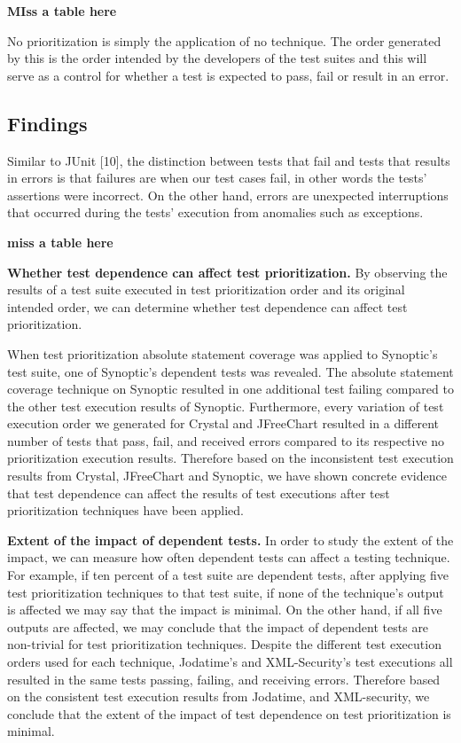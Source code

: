 \textbf{MIss a table here}

No prioritization is simply the application of no technique. The order generated by this is the order intended by the developers of the test suites and this will serve as a control for whether a test is expected to pass, fail or result in an error.

\subsection{Findings}

Similar to JUnit [10], the distinction between tests that fail and tests that results in errors is that failures are when our test cases fail, in other words the tests' assertions were incorrect. On the other hand, errors are unexpected interruptions that occurred during the tests' execution from anomalies such as exceptions.

\textbf{miss a table here}

\textbf{Whether test dependence can affect test prioritization.} By observing the results of a test suite executed in test prioritization order and its original intended order, we can determine whether test dependence can affect test prioritization. 

When test prioritization absolute statement coverage was applied to Synoptic's test suite, one of Synoptic's dependent tests was revealed. The absolute statement coverage technique on Synoptic resulted in one additional test failing compared to the other test execution results of Synoptic. Furthermore, every variation of test execution order we generated for Crystal and JFreeChart resulted in a different number of tests that pass, fail, and received errors compared to its respective no prioritization execution results. Therefore based on the inconsistent test execution results from Crystal, JFreeChart and Synoptic, we have shown concrete evidence that test dependence can affect the results of test executions after test prioritization techniques have been applied.

\textbf{Extent of the impact of dependent tests.} In order to study the extent of the impact, we can measure how often dependent tests can affect a testing technique. For example, if ten percent of a test suite are dependent tests, after applying five test prioritization techniques to that test suite, if none of the technique's output is affected we may say that the impact is minimal.  On the other hand, if all five outputs are affected, we may conclude that the impact of dependent tests are non-trivial for test prioritization techniques. 
Despite the different test execution orders used for each technique, Jodatime's and XML-Security's test executions all resulted in the same tests passing, failing, and receiving errors. Therefore based on the consistent test execution results from Jodatime, and XML-security, we conclude that the extent of the impact of test dependence on test prioritization is minimal.

